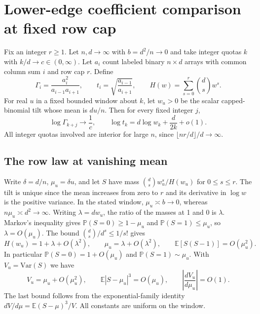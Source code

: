 \section{Lower-edge coefficient comparison at fixed row cap}\label{sec:lower}

Fix an integer $r\ge1$. Let $n,d\to\infty$ with $b=d^2/n\to0$
and take integer quotas $k$ with $k/d\to c\in(0,\infty)$. Let $a_i$
count labeled binary $n\times d$ arrays with common column sum $i$
and row cap $r$. Define
\begin{equation*}
\Gamma_i=\frac{a_i^2}{a_{i-1}a_{i+1}},\qquad
t_i=\sqrt{\frac{a_{i-1}}{a_{i+1}}},\qquad
H(w)=\sum_{s=0}^r\binom ds w^s .
\end{equation*}
For real $u$ in a fixed bounded window about $k$, let $w_u>0$ be
the scalar capped-binomial tilt whose mean is $du/n$. Then for
every fixed integer $j$,
\begin{equation}
\log\Gamma_{k+j}\longrightarrow\frac1c,\qquad
\log t_k=d\log w_k+\frac{d}{2k}+o(1).
\tag{L1}
\end{equation}
All integer quotas involved are interior for large $n$, since
$\lfloor nr/d\rfloor/d\to\infty$.

\subsection{The row law at vanishing mean}

Write $\delta=d/n$, $\mu_u=\delta u$, and let $S$ have mass
$\binom ds w_u^s/H(w_u)$ for $0\le s\le r$. The tilt is unique
since the mean increases from zero to $r$ and its derivative
in $\log w$ is the positive variance. In the stated window,
$\mu_u\asymp b\to0$, whereas $n\mu_u\asymp d^2\to\infty$.
Writing $\lambda=dw_u$, the ratio of the masses at 1 and 0
is $\lambda$. Markov's inequality gives
$\mathbb P(S=0)\ge1-\mu_u$ and $\mathbb P(S=1)\le\mu_u$,
so $\lambda=O(\mu_u)$. The bound $\binom ds/d^s\le1/s!$ gives
\begin{equation*}
H(w_u)=1+\lambda+O(\lambda^2),\qquad
\mu_u=\lambda+O(\lambda^2),\qquad
\mathbb E[S(S-1)]=O(\mu_u^2).
\end{equation*}
In particular $\mathbb P(S=0)=1+O(\mu_u)$ and
$\mathbb P(S=1)\sim\mu_u$. With $V_u=\mathrm{Var}(S)$ we have
\begin{equation}
V_u=\mu_u+O(\mu_u^2),\qquad
\mathbb E|S-\mu_u|^3=O(\mu_u),\qquad
\left|\frac{dV_u}{d\mu_u}\right|=O(1).
\tag{L2}
\end{equation}
The last bound follows from the exponential-family identity
$dV/d\mu=\mathbb E(S-\mu)^3/V$. All constants are uniform on
the window.

